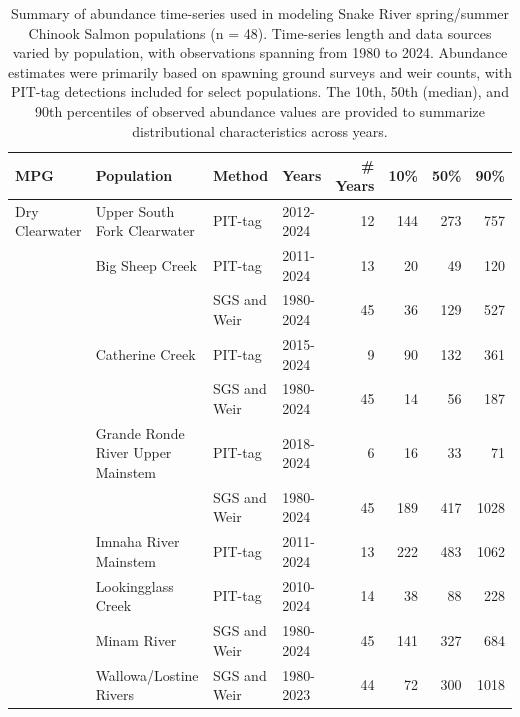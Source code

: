 \documentclass[10pt,a4paper]{article}
\begin{document}
\begin{table}
\centering
\caption{Summary of abundance time-series used in modeling Snake River spring/summer Chinook Salmon populations (n = 48). Time-series length and data sources varied by population, with observations spanning from 1980 to 2024. Abundance estimates were primarily based on spawning ground surveys and weir counts, with PIT-tag detections included for select populations. The 10th, 50th (median), and 90th percentiles of observed abundance values are provided to summarize distributional characteristics across years.}
\centering
\fontsize{8}{10}\selectfont
\begin{tabular}[t]{llllrrrr}
\toprule
MPG & Population & Method & Years & \# Years & 10\% & 50\% & 90\%\\
\midrule
Dry Clearwater & Upper South Fork Clearwater & PIT-tag & 2012-2024 & 12 & 144 & 273 & 757\\

 & Big Sheep Creek & PIT-tag & 2011-2024 & 13 & 20 & 49 & 120\\

 &  & SGS and Weir & 1980-2024 & 45 & 36 & 129 & 527\\

 & \multirow[t]{-2}{*}{\raggedright\arraybackslash Catherine Creek} & PIT-tag & 2015-2024 & 9 & 90 & 132 & 361\\

 &  & SGS and Weir & 1980-2024 & 45 & 14 & 56 & 187\\

 & \multirow[t]{-2}{*}{\raggedright\arraybackslash Grande Ronde River Upper Mainstem} & PIT-tag & 2018-2024 & 6 & 16 & 33 & 71\\

 &  & SGS and Weir & 1980-2024 & 45 & 189 & 417 & 1028\\

 & \multirow[t]{-2}{*}{\raggedright\arraybackslash Imnaha River Mainstem} & PIT-tag & 2011-2024 & 13 & 222 & 483 & 1062\\

 & Lookingglass Creek & PIT-tag & 2010-2024 & 14 & 38 & 88 & 228\\

 & Minam River & SGS and Weir & 1980-2024 & 45 & 141 & 327 & 684\\

 & Wallowa/Lostine Rivers & SGS and Weir & 1980-2023 & 44 & 72 & 300 & 1018\\


\end{tabular}
\end{table}
\end{document}
